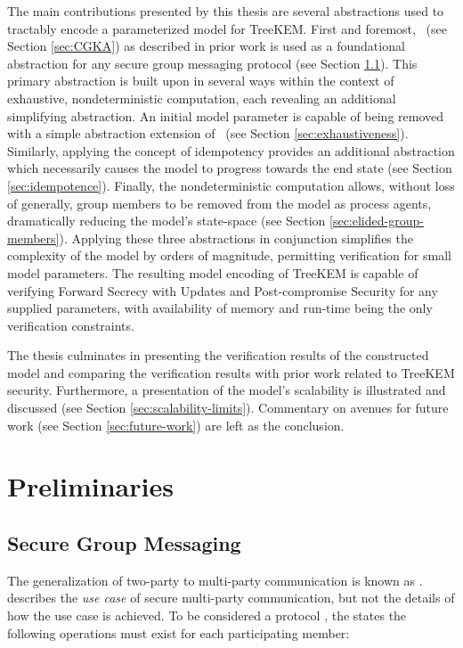 The main contributions presented by this thesis are several abstractions used to tractably encode a parameterized model for TreeKEM.
First and foremost, \CGKAdef\ (see Section \ref{sec:CGKA}) as described in prior work \autocite{alwen2020security} is used as a foundational abstraction for any secure group messaging protocol (see Section \ref{sec:secure-group-messaging}).
This primary abstraction is built upon in several ways within the context of exhaustive, nondeterministic computation, each revealing an additional simplifying abstraction.
An initial model parameter is capable of being removed with a simple abstraction extension of \CGKAdef\ (see Section \ref{sec:exhaustiveness}).
Similarly, applying the concept of idempotency provides an additional abstraction which necessarily causes the model to progress towards the end state (see Section \ref{sec:idempotence}).
Finally, the nondeterministic computation allows, without loss of generally, group members to be removed from the model as process agents, dramatically reducing the model's state-space (see Section \ref{sec:elided-group-members}).
Applying these three abstractions in conjunction simplifies the complexity of the model by orders of magnitude, permitting verification for small model parameters.
The resulting model encoding of TreeKEM is capable of verifying Forward Secrecy with Updates and Post-compromise Security for any supplied parameters, with availability of memory and run-time being the only verification constraints.

The thesis culminates in presenting the verification results of the constructed model and comparing the verification results with prior work related to TreeKEM security.
Furthermore, a presentation of the model's scalability is illustrated and discussed (see Section \ref{sec:scalability-limits}).
Commentary on avenues for future work (see Section \ref{sec:future-work}) are left as the conclusion.


\hypertarget{sec:preliminaries}{%
\chapter{Preliminaries}\label{sec:preliminaries}}

\hypertarget{sec:secure-group-messaging}{%
\section{Secure Group Messaging}\label{sec:secure-group-messaging}}

The generalization of two-party  to multi-party communication is known as  \autocite{cohn2018ends}.
 describes the \emph{use case} of secure multi-party communication, but not the details of how the use case is achieved.
To be considered a  protocol \autocite{ietf-mls-protocol-14}, the  states the following operations must exist for each participating member: 

